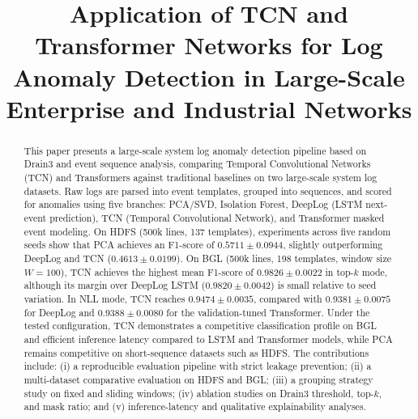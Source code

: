 \documentclass[conference]{IEEEtran}
\begin{document}
\title{
\textbf{Application of TCN and Transformer Networks for Log Anomaly Detection in Large-Scale Enterprise and Industrial Networks}\\[0.8em]
}

\author{
\and
{}
}

\maketitle

\begin{abstract}
This paper presents a large-scale system log anomaly detection pipeline based on Drain3 and event sequence analysis, comparing Temporal Convolutional Networks (TCN) and Transformers against traditional baselines on two large-scale system log datasets. Raw logs are parsed into event templates, grouped into sequences, and scored for anomalies using five branches: PCA/SVD, Isolation Forest, DeepLog (LSTM next-event prediction), TCN (Temporal Convolutional Network), and Transformer masked event modeling. On HDFS (500k lines, 137 templates), experiments across five random seeds show that PCA achieves an F1-score of $0.5711 \pm 0.0944$, slightly outperforming DeepLog and TCN ($0.4613 \pm 0.0199$). On BGL (500k lines, 198 templates, window size $W=100$), TCN achieves the highest mean F1-score of $0.9826 \pm 0.0022$ in top-$k$ mode, although its margin over DeepLog LSTM ($0.9820 \pm 0.0042$) is small relative to seed variation. In NLL mode, TCN reaches $0.9474 \pm 0.0035$, compared with $0.9381 \pm 0.0075$ for DeepLog and $0.9388 \pm 0.0080$ for the validation-tuned Transformer. Under the tested configuration, TCN demonstrates a competitive classification profile on BGL and efficient inference latency compared to LSTM and Transformer models, while PCA remains competitive on short-sequence datasets such as HDFS. The contributions include: (i) a reproducible evaluation pipeline with strict leakage prevention; (ii) a multi-dataset comparative evaluation on HDFS and BGL; (iii) a grouping strategy study on fixed and sliding windows; (iv) ablation studies on Drain3 threshold, top-$k$, and mask ratio; and (v) inference-latency and qualitative explainability analyses.
\end{abstract}
\end{document}
